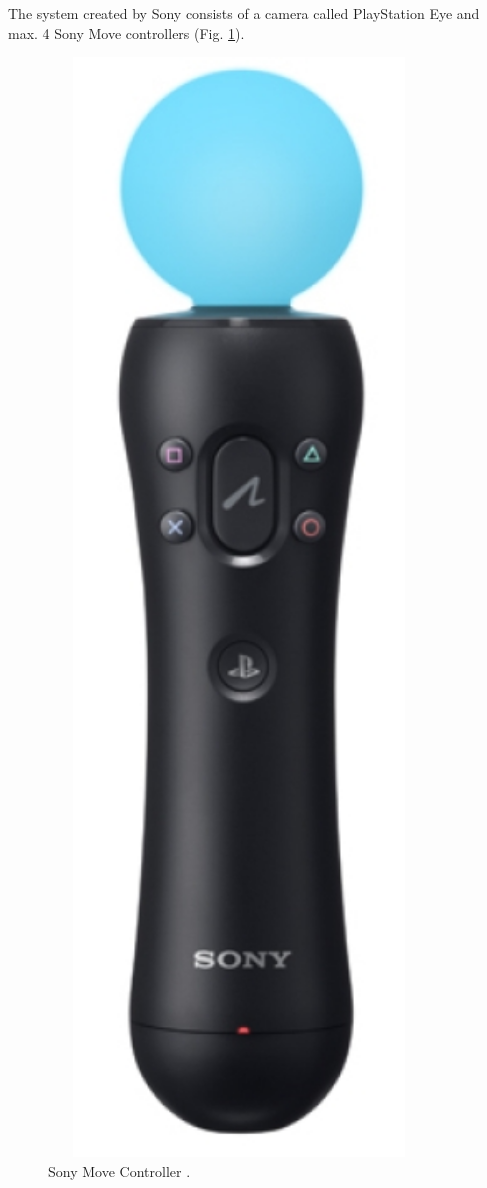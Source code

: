 \documentclass{jacsart}
\begin{document}
\indent The system created by Sony consists of a camera called PlayStation Eye and max. 4 Sony Move controllers (Fig. \ref{fig:moveControler}).

\begin{figure}[!t]
\includegraphics[angle=90, width=0.9\textwidth]{SonyMove.jpg}
\caption{Sony Move Controller \cite{Jr2011}.}
\label{fig:moveControler}
\end{figure}
\end{document}
